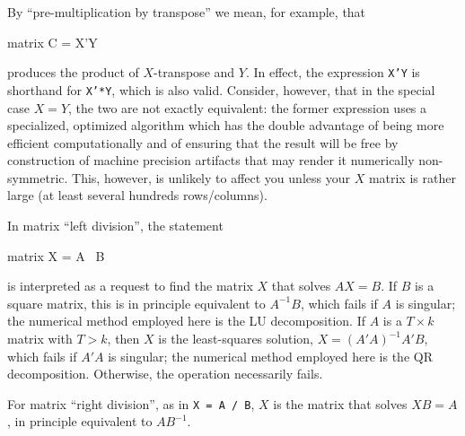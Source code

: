 By ``pre-multiplication by transpose'' we mean, for example, that 
%
\begin{code}
matrix C = X'Y
\end{code}
%
produces the product of $X$-transpose and $Y$.  In effect, the
expression \texttt{X'Y} is shorthand for \texttt{X'*Y}, which is also
valid. Consider, however, that in the special case $X = Y$, the two
are not exactly equivalent: the former expression uses a specialized,
optimized algorithm which has the double advantage of being more
efficient computationally and of ensuring that the result will be free
by construction of machine precision artifacts that may render it
numerically non-symmetric. This, however, is unlikely to affect you
unless your $X$ matrix is rather large (at least several hundreds
rows/columns).

In matrix ``left division'', the statement 
%
\begin{code}
matrix X = A \ B
\end{code}
%
is interpreted as a request to find the matrix $X$ that solves $AX=B$.
If $B$ is a square matrix, this is in principle equivalent to $A^{-1}B$,
which fails if $A$ is singular; the numerical method employed here is
the LU decomposition.  If $A$ is a $T \times k$ matrix with
$T > k$, then $X$ is the least-squares solution, $X = (A'A)^{-1}A'B$,
which fails if $A'A$ is singular; the numerical method employed here is
the QR decomposition.  Otherwise, the operation necessarily fails.

For matrix ``right division'', as in \texttt{X = A / B}, $X$ is the
matrix that solves $XB = A$, in principle equivalent to $AB^{-1}$.

